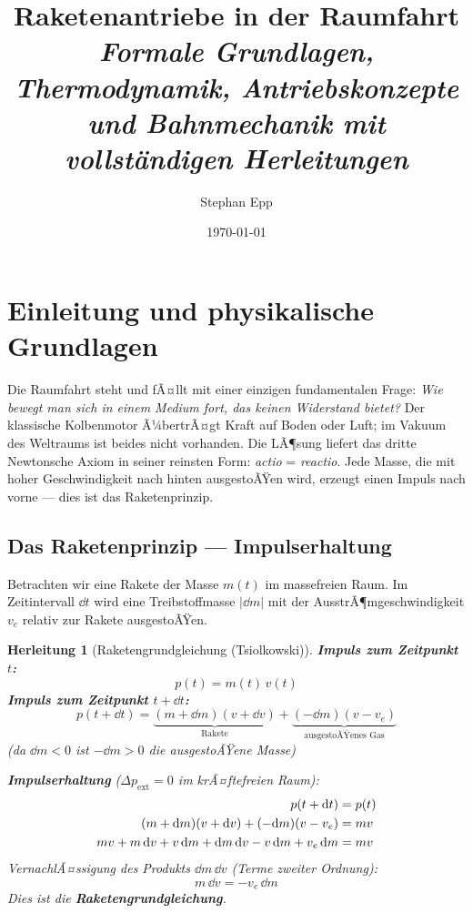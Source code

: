﻿\documentclass[12pt,a4paper]{article}
\title{Raketenantriebe in der Raumfahrt\\[0.4em]
  \large\textit{Formale Grundlagen, Thermodynamik, Antriebskonzepte\\
und Bahnmechanik mit vollst\"{a}ndigen Herleitungen}}
\author{Stephan Epp}
\date{\today}
\newtheorem{herleitung}{Herleitung}[section]
\newcommand{\ve}{v_e}
\begin{document}
\maketitle

\tableofcontents
\newpage

\section{Einleitung und physikalische Grundlagen}

Die Raumfahrt steht und fÃ¤llt mit einer einzigen fundamentalen Frage: \emph{Wie bewegt
man sich in einem Medium fort, das keinen Widerstand bietet?} Der klassische
Kolbenmotor Ã¼bertrÃ¤gt Kraft auf Boden oder Luft; im Vakuum des Weltraums ist beides
nicht vorhanden. Die LÃ¶sung liefert das dritte Newtonsche Axiom in seiner reinsten
Form: \textit{actio} = \textit{reactio}. Jede Masse, die mit hoher Geschwindigkeit
nach hinten ausgestoÃŸen wird, erzeugt einen Impuls nach vorne --- dies ist das
Raketenprinzip.

\subsection{Das Raketenprinzip --- Impulserhaltung}

Betrachten wir eine Rakete der Masse $m(t)$ im massefreien Raum. Im Zeitintervall
$\dd t$ wird eine Treibstoffmasse $|\dd m|$ mit der AusstrÃ¶mgeschwindigkeit $\ve$
relativ zur Rakete ausgestoÃŸen.

\begin{herleitung}[Raketengrundgleichung (Tsiolkowski)]
\textbf{Impuls zum Zeitpunkt $t$:}
\[
  p(t) = m(t)\,v(t)
\]
\textbf{Impuls zum Zeitpunkt $t + \dd t$:}
\[
  p(t+\dd t) = \underbrace{(m+\dd m)(v+\dd v)}_{\text{Rakete}} +
               \underbrace{(-\dd m)(v - \ve)}_{\text{ausgestoÃŸenes Gas}}
\]
(da $\dd m < 0$ ist $-\dd m > 0$ die ausgestoÃŸene Masse)

\textbf{Impulserhaltung} ($\Delta p_{\text{ext}} = 0$ im krÃ¤ftefreien Raum):
\begin{align}
  p(t+\dd t) &= p(t) \notag\\
  (m+\dd m)(v+\dd v) + (-\dd m)(v-\ve) &= mv \notag\\
  mv + m\,\dd v + v\,\dd m + \dd m\,\dd v - v\,\dd m + \ve\,\dd m &= mv \notag
\end{align}
VernachlÃ¤ssigung des Produkts $\dd m\,\dd v$ (Terme zweiter Ordnung):
\[
  \boxed{m\,\dd v = -\ve\,\dd m}
\]
Dies ist die \textbf{Raketengrundgleichung}.
\end{herleitung}
\end{document}

